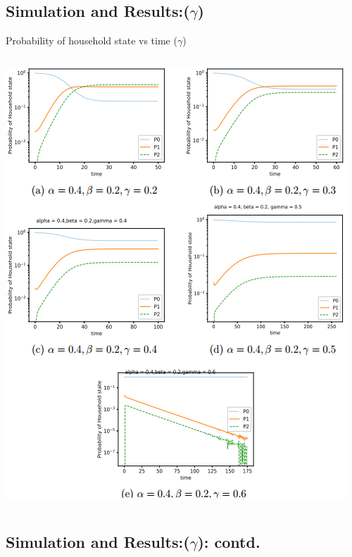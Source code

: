 \documentclass[smaller,aspectratio=169, toc=bibliography]{beamer}
\begin{document}
\subsection*{Simulation and Results:($\gamma$) }

\begin{frame}{Probability of household state vs time ($\gamma$)}
\begin{columns}[c]
        \begin{center}
        \includegraphics[scale=0.3]{screenshot/9gammaP_kvstime.png}
        \end{center}
\end{columns}
\end{frame}

\subsection*{Simulation and Results:($\gamma$): contd. }
\end{document}
